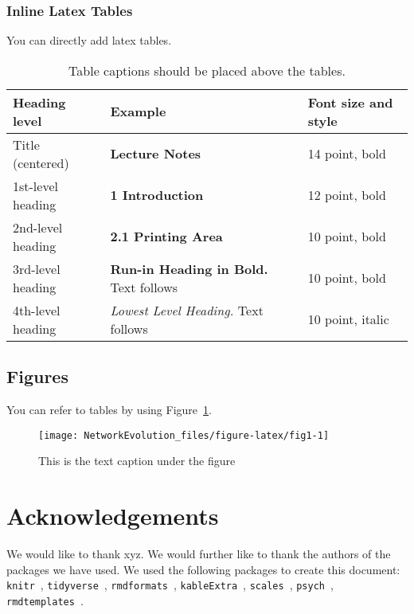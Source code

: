 \documentclass[runningheads]{llncs}
\begin{document}
\hypertarget{inline-latex-tables}{%
\subsubsection{Inline Latex Tables}\label{inline-latex-tables}}

You can directly add latex tables.

\begin{table}
\caption{Table captions should be placed above the
tables.}\label{tab1}
\begin{tabular}{|l|l|l|}
\hline
Heading level &  Example & Font size and style\\
\hline
Title (centered) &  {\Large\bfseries Lecture Notes} & 14 point, bold\\
1st-level heading &  {\large\bfseries 1 Introduction} & 12 point, bold\\
2nd-level heading & {\bfseries 2.1 Printing Area} & 10 point, bold\\
3rd-level heading & {\bfseries Run-in Heading in Bold.} Text follows & 10 point, bold\\
4th-level heading & {\itshape Lowest Level Heading.} Text follows & 10 point, italic\\
\hline
\end{tabular}
\end{table}

\hypertarget{figures}{%
\subsection{Figures}\label{figures}}

You can refer to tables by using Figure~\ref{fig:fig1}.

\begin{figure}
\texttt{[image: NetworkEvolution\_files/figure-latex/fig1-1]} \caption{This is the text caption under the figure}\label{fig:fig1}
\end{figure}

\hypertarget{acknowledgements}{%
\section*{Acknowledgements}\label{acknowledgements}}

We would like to thank xyz. We would further like to thank the authors
of the packages we have used. We used the following packages to create
this document: \texttt{knitr}~\autocite{R-knitr},
\texttt{tidyverse}~\autocite{R-tidyverse},
\texttt{rmdformats}~\autocite{R-rmdformats},
\texttt{kableExtra}~\autocite{R-kableExtra},
\texttt{scales}~\autocite{R-scales}, \texttt{psych}~\autocite{R-psych},
\texttt{rmdtemplates}~\autocite{R-rmdtemplates}.


%
%
%
%
%
\printbibliography
\end{document}
